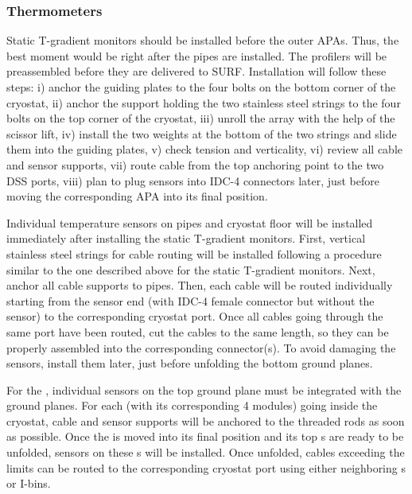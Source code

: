 \subsubsection{Thermometers}
\label{sec:fdgen-slow-cryo-instal-th}

Static T-gradient monitors should be installed before the outer APAs. Thus, the best moment would be right after the pipes are installed. The profilers will be preassembled before they are delivered to SURF. 
Installation will follow these steps: 
i) anchor the guiding plates to the four bolts on the bottom corner of the cryostat,
ii) anchor the support holding the two stainless steel strings to the four bolts on the top corner of the cryostat,
iii) unroll the array with the help of the scissor lift,
iv) install the two weights at the bottom of the two strings and slide them  into the guiding plates, 
v) check tension and verticality,
vi) review all cable and sensor supports, 
vii) route cable from the top anchoring point to the two DSS ports, 
viii) plan to plug sensors into IDC-4 connectors later, just before moving the corresponding APA into its final position. 

Individual temperature sensors on pipes and cryostat floor will be installed immediately after installing the static T-gradient monitors. First, vertical stainless steel strings for cable routing will be installed following a procedure similar to the one described above for the static T-gradient monitors. Next, anchor all cable supports to pipes. Then, each cable will be routed individually starting from the sensor end (with IDC-4 female connector but without the sensor)
to the corresponding cryostat port. Once all cables going through the same port have been routed, cut the cables to the same length, so they can be properly assembled into the corresponding connector(s). To avoid damaging the sensors, install them later, just before unfolding the bottom ground planes.

For the , individual sensors on the top ground plane must be integrated with the ground planes. For each  (with its corresponding 4  modules)
going inside the cryostat, cable and sensor supports will be anchored to the  threaded rods as soon as possible.
Once the  is moved into its final position and its top s are ready to be unfolded, sensors on these s will be installed. Once unfolded, cables 
exceeding the  limits can be routed to the corresponding cryostat port using either neighboring s or  I-bins. 



